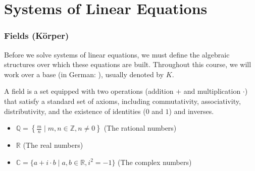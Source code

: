 \setcounter{chapter}{5}
\renewcommand{\thetheorem}{\thechapter.\arabic{theorem}}
\setcounter{theorem}{0}

\chapter{Systems of Linear Equations}

\subsection{Fields (Körper)}

Before we solve systems of linear equations, we must define the algebraic structures over which these equations are built. Throughout this course, we will work over a base  (in German: ), usually denoted by $K$. 

A field is a set equipped with two operations (addition $+$ and multiplication $\cdot$) that satisfy a standard set of axioms, including commutativity, associativity, distributivity, and the existence of identities ($0$ and $1$) and inverses.

\begin{example}
\begin{itemize}
    \item $\mathbb{Q} = \left\{\frac{m}{n} \mid m, n \in \mathbb{Z}, n \ne 0\right\}$ (The rational numbers)
    \item $\mathbb{R}$ (The real numbers)
    \item $\mathbb{C} = \{a + i \cdot b \mid a, b \in \mathbb{R}, i^2 = -1\}$ (The complex numbers)
\end{itemize}
\end{example}

